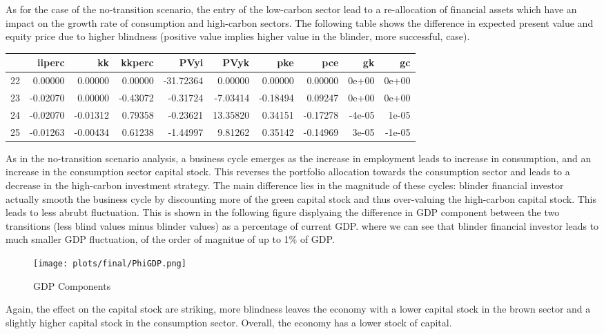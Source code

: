 \documentclass[]{article}
\begin{document}
As for the case of the no-transition scenario, the entry of the
low-carbon sector lead to a re-allocation of financial assets which have
an impact on the growth rate of consumption and high-carbon sectors. The
following table shows the difference in expected present value and
equity price due to higher blindness (positive value implies higher
value in the blinder, more successful, case).

\begin{longtable}[]{@{}lrrrrrrrrr@{}}
\toprule
& iiperc & kk & kkperc & PVyi & PVyk & pke & pce & gk &
gc\tabularnewline
\midrule
\endhead
22 & 0.00000 & 0.00000 & 0.00000 & -31.72364 & 0.00000 & 0.00000 &
0.00000 & 0e+00 & 0e+00\tabularnewline
23 & -0.02070 & 0.00000 & -0.43072 & -0.31724 & -7.03414 & -0.18494 &
0.09247 & 0e+00 & 0e+00\tabularnewline
24 & -0.02070 & -0.01312 & 0.79358 & -0.23621 & 13.35820 & 0.34151 &
-0.17278 & -4e-05 & 1e-05\tabularnewline
25 & -0.01263 & -0.00434 & 0.61238 & -1.44997 & 9.81262 & 0.35142 &
-0.14969 & 3e-05 & -1e-05\tabularnewline
\bottomrule
\end{longtable}

As in the no-transition scenario analysis, a business cycle emerges as
the increase in employment leads to increase in consumption, and an
increase in the consumption sector capital stock. This reverses the
portfolio allocation towards the consumption sector and leads to a
decrease in the high-carbon investment strategy. The main difference
lies in the magnitude of these cycles: blinder financial investor
actually smooth the business cycle by discounting more of the green
capital stock and thus over-valuing the high-carbon capital stock. This
leads to less abrubt fluctuation. This is shown in the following figure
displyaing the difference in GDP component between the two transitions
(less blind values minus blinder values) as a percentage of current GDP.
where we can see that blinder financial investor leads to much smaller
GDP fluctuation, of the order of magnitue of up to 1\% of GDP.

\begin{figure}[htbp]
\centering
\texttt{[image: plots/final/PhiGDP.png]}
\caption{GDP Components}
\end{figure}

Again, the effect on the capital stock are striking, more blindness
leaves the economy with a lower capital stock in the brown sector and a
slightly higher capital stock in the consumption sector. Overall, the
economy has a lower stock of capital.
\end{document}
